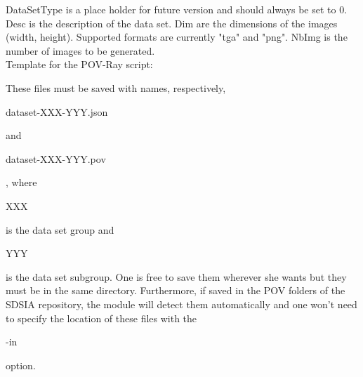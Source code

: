 DataSetType is a place holder for future version and should always be set to 0. Desc is the description of the data set. Dim are the dimensions of the images (width, height). Supported formats are currently "tga" and "png". NbImg is the number of images to be generated.\\

Template for the POV-Ray script:\\
\begin{scriptsize}
\begin{ttfamily}

\end{ttfamily}
\end{scriptsize}

These files must be saved with names, respectively, \begin{ttfamily}dataset-XXX-YYY.json\end{ttfamily} and \begin{ttfamily}dataset-XXX-YYY.pov\end{ttfamily}, where \begin{ttfamily}XXX\end{ttfamily} is the data set group and \begin{ttfamily}YYY\end{ttfamily} is the data set subgroup. One is free to save them wherever she wants but they must be in the same directory. Furthermore, if saved in the POV folders of the SDSIA repository, the module will detect them automatically and one won't need to specify the location of these files with the \begin{ttfamily}-in\end{ttfamily} option.\\

